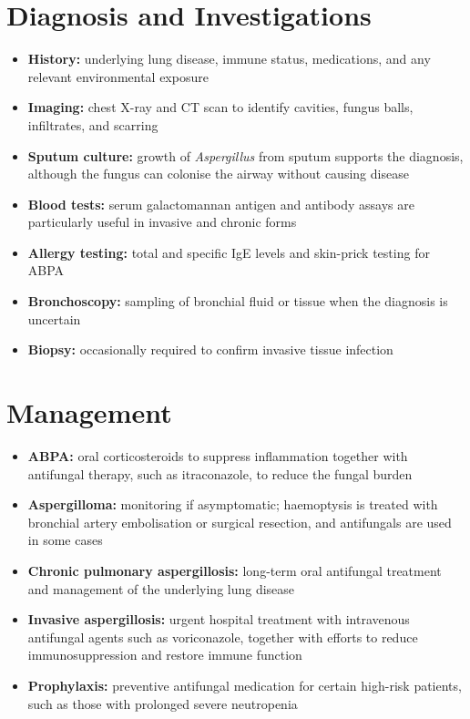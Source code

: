 \section*{Diagnosis and Investigations}
\begin{itemize}
    \item \textbf{History:} underlying lung disease, immune status, medications, and any relevant environmental exposure
    \item \textbf{Imaging:} chest X-ray and CT scan to identify cavities, fungus balls, infiltrates, and scarring
    \item \textbf{Sputum culture:} growth of \textit{Aspergillus} from sputum supports the diagnosis, although the fungus can colonise the airway without causing disease
    \item \textbf{Blood tests:} serum galactomannan antigen and antibody assays are particularly useful in invasive and chronic forms
    \item \textbf{Allergy testing:} total and specific IgE levels and skin-prick testing for ABPA
    \item \textbf{Bronchoscopy:} sampling of bronchial fluid or tissue when the diagnosis is uncertain
    \item \textbf{Biopsy:} occasionally required to confirm invasive tissue infection
\end{itemize}

\section*{Management}
\begin{itemize}
    \item \textbf{ABPA:} oral corticosteroids to suppress inflammation together with antifungal therapy, such as itraconazole, to reduce the fungal burden
    \item \textbf{Aspergilloma:} monitoring if asymptomatic; haemoptysis is treated with bronchial artery embolisation or surgical resection, and antifungals are used in some cases
    \item \textbf{Chronic pulmonary aspergillosis:} long-term oral antifungal treatment and management of the underlying lung disease
    \item \textbf{Invasive aspergillosis:} urgent hospital treatment with intravenous antifungal agents such as voriconazole, together with efforts to reduce immunosuppression and restore immune function
    \item \textbf{Prophylaxis:} preventive antifungal medication for certain high-risk patients, such as those with prolonged severe neutropenia
\end{itemize}

